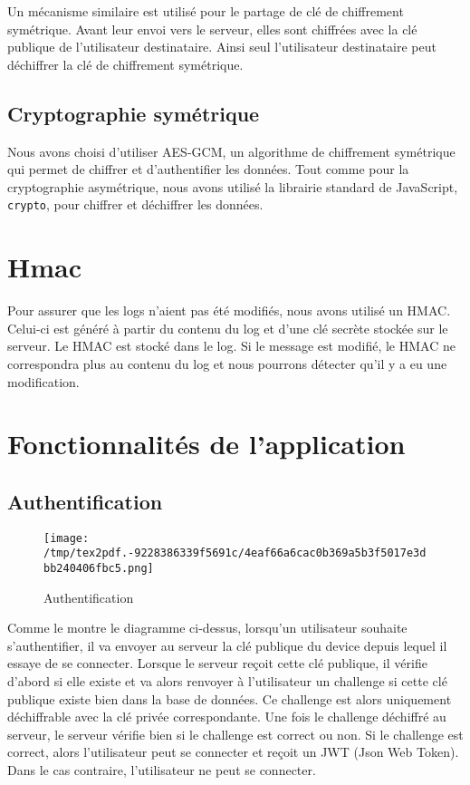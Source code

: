 \documentclass[
  11pt,
  paper=a4,
  ,captions=tableheading
]{scrartcl}
\begin{document}
Un mécanisme similaire est utilisé pour le partage de clé de chiffrement
symétrique. Avant leur envoi vers le serveur, elles sont chiffrées avec
la clé publique de l’utilisateur destinataire. Ainsi seul l’utilisateur
destinataire peut déchiffrer la clé de chiffrement symétrique.

\hypertarget{cryptographie-symuxe9trique}{%
\subsection{Cryptographie
symétrique}\label{cryptographie-symuxe9trique}}

Nous avons choisi d’utiliser AES-GCM, un algorithme de chiffrement
symétrique qui permet de chiffrer et d’authentifier les données. Tout
comme pour la cryptographie asymétrique, nous avons utilisé la librairie
standard de JavaScript, \texttt{crypto}, pour chiffrer et
déchiffrer les données.

\hypertarget{hmac}{%
\section{Hmac}\label{hmac}}

Pour assurer que les logs n’aient pas été modifiés, nous avons utilisé
un HMAC. Celui-ci est généré à partir du contenu du log et d’une clé
secrète stockée sur le serveur. Le HMAC est stocké dans le log. Si le
message est modifié, le HMAC ne correspondra plus au contenu du log et
nous pourrons détecter qu’il y a eu une modification.

\hypertarget{fonctionnalituxe9s-de-lapplication}{%
\section{Fonctionnalités de
l’application}\label{fonctionnalituxe9s-de-lapplication}}

\hypertarget{authentification}{%
\subsection{Authentification}\label{authentification}}

\begin{figure}
\centering
\texttt{[image: /tmp/tex2pdf.-9228386339f5691c/4eaf66a6cac0b369a5b3f5017e3dbb240406fbc5.png]}
\caption{Authentification}
\end{figure}

Comme le montre le diagramme ci-dessus, lorsqu’un utilisateur souhaite
s’authentifier, il va envoyer au serveur la clé publique du device
depuis lequel il essaye de se connecter. Lorsque le serveur reçoit cette
clé publique, il vérifie d’abord si elle existe et va alors renvoyer à
l’utilisateur un challenge si cette clé publique existe bien dans la
base de données. Ce challenge est alors uniquement déchiffrable avec la
clé privée correspondante. Une fois le challenge déchiffré au serveur,
le serveur vérifie bien si le challenge est correct ou non. Si le
challenge est correct, alors l’utilisateur peut se connecter et reçoit
un JWT (Json Web Token). Dans le cas contraire, l’utilisateur ne peut se
connecter.
\end{document}
